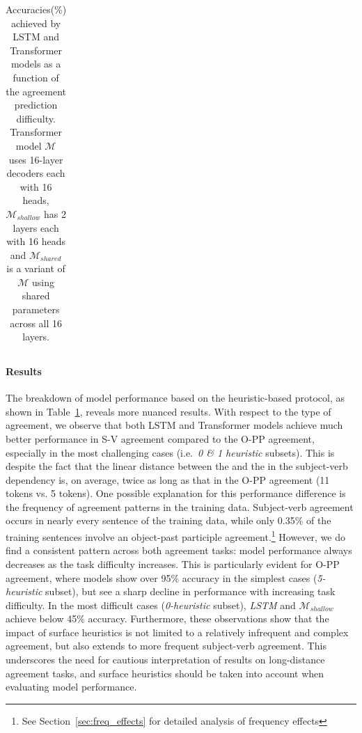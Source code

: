 \begin{table}[ht]
\begin{tabular}{llrcccc}
    \bottomrule
  \end{tabular}
\caption{Accuracies(\%) achieved by LSTM and Transformer models as a
  function of the agreement prediction difficulty. Transformer model $\mathcal{M}$ uses 16-layer decoders each with 16 heads, $\mathcal{M}_{shallow}$ has 2 layers each with 16 heads and $\mathcal{M}_{shared}$ is a variant of $\mathcal{M}$ using shared parameters across all 16 layers.  \label{tab:original-heuristics}
}
\end{table}

\paragraph{Results} The breakdown of model performance based on the heuristic-based protocol, as shown in Table~\ref{tab:original-heuristics}, reveals more nuanced results. With respect to the type of agreement, we
observe that both LSTM and Transformer models achieve much better
performance in S-V agreement compared to the O-PP agreement, especially in the most challenging cases (i.e.\ \emph{0 \& 1
heuristic} subsets). This is despite the fact that the linear distance between the \cue
and the \target in the subject-verb dependency is, on average, twice as long as that
in the O-PP agreement (11 tokens vs. 5 tokens). One possible explanation for this performance difference is the frequency of agreement
patterns in the training data. Subject-verb agreement occurs
in nearly every sentence of the training data, while only 0.35\% of the
training sentences involve an object-past participle
agreement.\footnote{See Section~\ref{sec:freq_effects} for detailed analysis of frequency effects} However, we do find a consistent pattern across both agreement tasks: model performance always decreases as the task difficulty increases. This is particularly evident for O-PP agreement, where models show over 95\% accuracy
in the simplest cases (\textit{5-heuristic} subset), but see a sharp decline in performance with increasing task difficulty. In the most difficult cases (\textit{0-heuristic} subset), \textit{LSTM} and $\mathcal{M}_{shallow}$ achieve below 45\% accuracy. Furthermore, these observations show that the impact of surface heuristics is not limited to a relatively
infrequent and complex agreement, but also extends to more frequent subject-verb agreement. This underscores the need for cautious interpretation of results on long-distance agreement tasks, and surface heuristics should be taken into account when evaluating model performance. 

